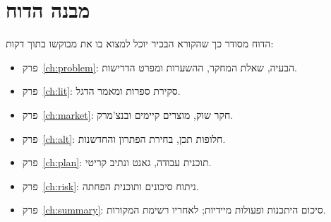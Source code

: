 \section{מבנה הדוח}\label{sec:structure}
הדוח מסודר כך שהקורא הבכיר יוכל למצוא בו את מבוקשו בתוך דקות:
\begin{itemize}
  \item פרק~\ref{ch:problem}: הבעיה, שאלת המחקר, ההשערות ומפרט הדרישות.
  \item פרק~\ref{ch:lit}: סקירת ספרות ומאמר הדגל.
  \item פרק~\ref{ch:market}: חקר שוק, מוצרים קיימים ובנצ'מרק.
  \item פרק~\ref{ch:alt}: חלופות תכן, בחירת הפתרון והחדשנות.
  \item פרק~\ref{ch:plan}: תוכנית עבודה, גאנט ונתיב קריטי.
  \item פרק~\ref{ch:risk}: ניתוח סיכונים ותוכנית הפחתה.
  \item פרק~\ref{ch:summary}: סיכום היתכנות ופעולות מיידיות; לאחריו רשימת המקורות.
\end{itemize}
